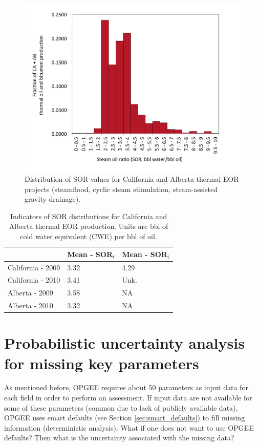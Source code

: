 \documentclass[11pt]{report}
\begin{document}
\begin{figure}[t]
\includegraphics[width=0.85\columnwidth]{images/SOR_dist.pdf}
\caption{Distribution of SOR values for California and Alberta thermal EOR projects (steamflood, cyclic steam stimulation, steam-assisted gravity drainage).}
\label{fig:SOR_dist}
\end{figure}


\begin{table}
\caption{Indicators of SOR distributions for California and Alberta thermal EOR production. Units are bbl of cold water equivalent (CWE) per bbl of oil.}
\label{tab:SOR_stats}
\begin{scriptsize}
\begin{tabularx}{1\columnwidth}{p{}p{}p{}}
\toprule
& Mean - SOR$_t$ & Mean - SOR$_i$ \\
\midrule
California - 2009 & 3.32 & 4.29 \\
California - 2010 & 3.41 & Unk. \\
Alberta - 2009 & 3.58 & NA \\
Alberta - 2010 & 3.32 & NA \\
\bottomrule
\end{tabularx}
\end{scriptsize}
\end{table}

\section{Probabilistic uncertainty analysis for missing key parameters}
\label{sec:Montecarlo}

As mentioned before, OPGEE requires about 50 parameters as input data for each field in order to perform an assessment. If input data are not available for some of these parameters (common due to lack of publicly available data), OPGEE uses smart defaults (see Section \ref{sec:smart_defaults}) to fill missing information (deterministic analysis). What if one does not want to use OPGEE defaults? Then what is the uncertainty associated with the missing data?
\end{document}
